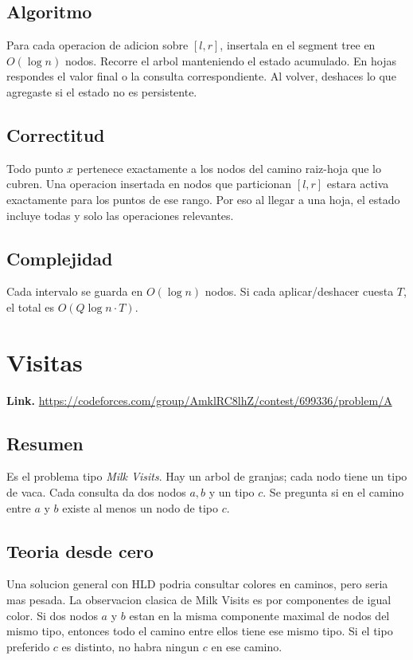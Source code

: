 \documentclass[10pt]{article}
\newcommand{\bigO}{O}
\begin{document}
\subsection*{Algoritmo}
Para cada operacion de adicion sobre $[l,r]$, insertala en el segment tree en
$\bigO(\log n)$ nodos. Recorre el arbol manteniendo el estado acumulado. En hojas
respondes el valor final o la consulta correspondiente. Al volver, deshaces lo
que agregaste si el estado no es persistente.

\subsection*{Correctitud}
Todo punto $x$ pertenece exactamente a los nodos del camino raiz-hoja que lo
cubren. Una operacion insertada en nodos que particionan $[l,r]$ estara activa
exactamente para los puntos de ese rango. Por eso al llegar a una hoja, el estado
incluye todas y solo las operaciones relevantes.

\subsection*{Complejidad}
Cada intervalo se guarda en $\bigO(\log n)$ nodos. Si cada aplicar/deshacer cuesta
$T$, el total es $\bigO(Q\log n\cdot T)$.

\clearpage
\section{Visitas}
\textbf{Link.} \url{https://codeforces.com/group/AmklRC8lhZ/contest/699336/problem/A}

\subsection*{Resumen}
Es el problema tipo \emph{Milk Visits}. Hay un arbol de granjas; cada nodo tiene
un tipo de vaca. Cada consulta da dos nodos $a,b$ y un tipo $c$. Se pregunta si
en el camino entre $a$ y $b$ existe al menos un nodo de tipo $c$.

\subsection*{Teoria desde cero}
Una solucion general con HLD podria consultar colores en caminos, pero seria mas
pesada. La observacion clasica de Milk Visits es por componentes de igual color.
Si dos nodos $a$ y $b$ estan en la misma componente maximal de nodos del mismo
tipo, entonces todo el camino entre ellos tiene ese mismo tipo. Si el tipo
preferido $c$ es distinto, no habra ningun $c$ en ese camino.
\end{document}
